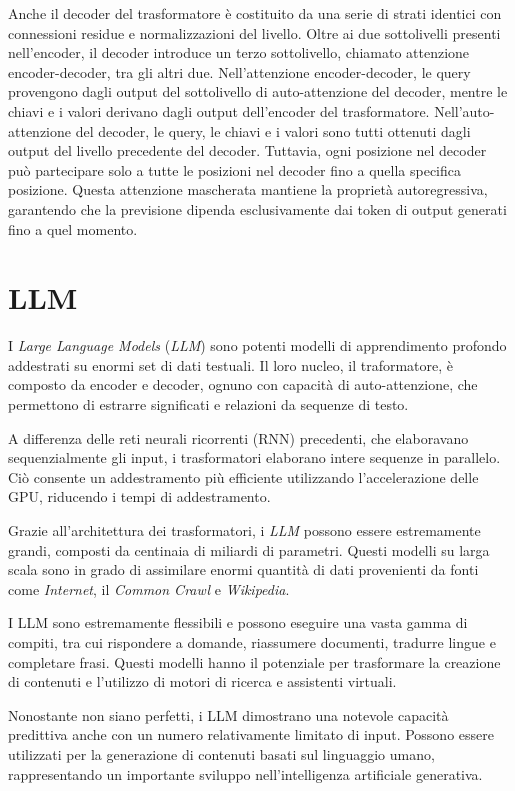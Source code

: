Anche il decoder del trasformatore è costituito da una serie di strati identici con connessioni residue e normalizzazioni del livello. Oltre ai due sottolivelli presenti nell'encoder, il decoder introduce un terzo sottolivello, chiamato attenzione encoder-decoder, tra gli altri due. Nell'attenzione encoder-decoder, le query provengono dagli output del sottolivello di auto-attenzione del decoder, mentre le chiavi e i valori derivano dagli output dell'encoder del trasformatore. Nell'auto-attenzione del decoder, le query, le chiavi e i valori sono tutti ottenuti dagli output del livello precedente del decoder. Tuttavia, ogni posizione nel decoder può partecipare solo a tutte le posizioni nel decoder fino a quella specifica posizione. Questa attenzione mascherata mantiene la proprietà autoregressiva, garantendo che la previsione dipenda esclusivamente dai token di output generati fino a quel momento.


\section{LLM}\label{sec:llm}

I \emph{Large Language Models} (\emph{LLM}) sono potenti modelli di apprendimento profondo addestrati su enormi set di dati testuali. Il loro nucleo, il traformatore, è composto da encoder e decoder, ognuno con capacità di auto-attenzione, che permettono di estrarre significati e relazioni da sequenze di testo.

A differenza delle reti neurali ricorrenti (RNN) precedenti, che elaboravano sequenzialmente gli input, i trasformatori elaborano intere sequenze in parallelo. Ciò consente un addestramento più efficiente utilizzando l'accelerazione delle GPU, riducendo i tempi di addestramento.

Grazie all'architettura dei trasformatori, i \emph{LLM} possono essere estremamente grandi, composti da centinaia di miliardi di parametri. Questi modelli su larga scala sono in grado di assimilare enormi quantità di dati provenienti da fonti come \emph{Internet}, il \emph{Common Crawl} e \emph{Wikipedia}.

I LLM sono estremamente flessibili e possono eseguire una vasta gamma di compiti, tra cui rispondere a domande, riassumere documenti, tradurre lingue e completare frasi. Questi modelli hanno il potenziale per trasformare la creazione di contenuti e l'utilizzo di motori di ricerca e assistenti virtuali.

Nonostante non siano perfetti, i LLM dimostrano una notevole capacità predittiva anche con un numero relativamente limitato di input. Possono essere utilizzati per la generazione di contenuti basati sul linguaggio umano, rappresentando un importante sviluppo nell'intelligenza artificiale generativa.

